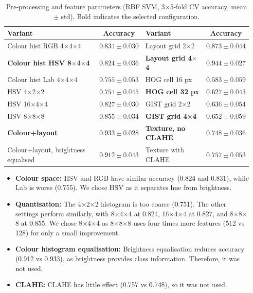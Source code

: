 \documentclass[12pt]{article}
\begin{document}
\begin{table}[h]
    \centering
    \caption{Pre-processing and feature parameters (RBF SVM, 3$\times$5-fold CV accuracy, mean $\pm$ std). Bold indicates the selected configuration.}
    \label{tab:preprocessing_features}
    \scriptsize
    \setlength{\tabcolsep}{4pt}
    \begin{tabular}{lclc}
        \toprule
        Variant & Accuracy & Variant & Accuracy \\
        \midrule
        Colour hist RGB 4$\times$4$\times$4 & $0.831\pm0.030$ &
        Layout grid 2$\times$2 & $0.873\pm0.044$ \\
        \textbf{Colour hist HSV 8$\times$4$\times$4} & $\mathbf{0.824\pm0.036}$ &
        \textbf{Layout grid 4$\times$4} & $\mathbf{0.944\pm0.027}$ \\
        Colour hist Lab 4$\times$4$\times$4 & $0.755\pm0.053$ &
        HOG cell 16 px & $0.583\pm0.059$ \\
        HSV 4$\times$2$\times$2 & $0.751\pm0.045$ &
        \textbf{HOG cell 32 px} & $\mathbf{0.627\pm0.043}$ \\
        HSV 16$\times$4$\times$4 & $0.827\pm0.030$ &
        GIST grid 2$\times$2 & $0.636\pm0.054$ \\
        HSV 8$\times$8$\times$8 & $0.855\pm0.034$ &
        \textbf{GIST grid 4$\times$4} & $\mathbf{0.652\pm0.059}$ \\
        \textbf{Colour+layout} & $\mathbf{0.933\pm0.028}$ &
        \textbf{Texture, no CLAHE} & $\mathbf{0.748\pm0.036}$ \\
        Colour+layout, brightness equalised & $0.912\pm0.043$ &
        Texture with CLAHE & $0.757\pm0.053$ \\
        \bottomrule
    \end{tabular}
\end{table}
\begin{itemize}
\item \textbf{Colour space:} HSV and RGB have similar accuracy (0.824 and 0.831), while Lab is worse (0.755). We chose HSV as it separates hue from brightness.
\item \textbf{Quantisation:} The 4$\times$2$\times$2 histogram is too coarse (0.751). The other settings perform similarly, with 8$\times$4$\times$4 at 0.824, 16$\times$4$\times$4 at 0.827, and 8$\times$8$\times$8 at 0.855. We chose 8$\times$4$\times$4 as 8$\times$8$\times$8 uses four times more features (512 vs 128) for only a small improvement.

\item \textbf{Colour histogram equalisation:} Brightness equalisation reduces accuracy (0.912 vs 0.933), as brightness provides class information. Therefore, it was not used.

\item \textbf{CLAHE:} CLAHE has little effect (0.757 vs 0.748), so it was not used.
\end{itemize}
\end{document}
